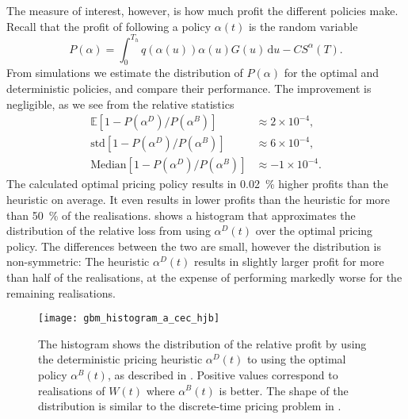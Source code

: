 \documentclass[main.tex]{subfiles}
\begin{document}
\begin{example}
  The measure of interest, however, is how much profit the different
  policies make. Recall that the profit of following a policy
  $\alpha(t)$ is the random variable
  \begin{equation}
    P(\alpha)=\int_0^{T_h}q(\alpha(u))\alpha(u)G(u)\,\mathrm{d}u-CS^\alpha(T).
  \end{equation}
  From simulations we estimate the distribution of $P(\alpha)$ for the
  optimal and deterministic policies, and compare their performance.
  The improvement is negligible, as we see from the relative statistics
  \begin{align}
    \mathbb{E}\left[1-P(\alpha^D)/P(\alpha^B)\right]
    &\approx 2\times 10^{-4},\\
    \mbox{std}\left[1-P(\alpha^D)/P(\alpha^B)\right]
    &\approx 6\times 10^{-4},\\
    \mbox{Median}\left[1-P(\alpha^D)/P(\alpha^B)\right]
    &\approx -1\times 10^{-4}.
  \end{align}
  The calculated optimal pricing policy results in \SI{0.02}{\percent} higher profits
  than the heuristic on average. It even results in lower profits than the
  heuristic for more than \SI{50}{\percent} of the realisations.
   shows a histogram that approximates
  the distribution of the relative loss from using $\alpha^D(t)$
  over the optimal pricing policy. The differences between the two are
  small, however the distribution is non-symmetric:
  The heuristic $\alpha^D(t)$ results in slightly larger profit for more
  than half of
  the realisations, at the expense of performing markedly worse for the remaining realisations.
  \begin{figure}[htb]
    \centering
    \texttt{[image: gbm\_histogram\_a\_cec\_hjb]}
    \caption{The histogram shows the distribution of the relative
      profit by using the deterministic pricing heuristic $\alpha^D(t)$
      to using the optimal policy $\alpha^B(t)$, as described in
      . %
      Positive values
      correspond to realisations of $W(t)$ where
      $\alpha^B(t)$ is better.
      The shape of the distribution is similar to the discrete-time pricing problem
      in .
    }\label{fig:gbm_histogram_a_cec_hjb}
  \end{figure}
\end{example}
\end{document}
